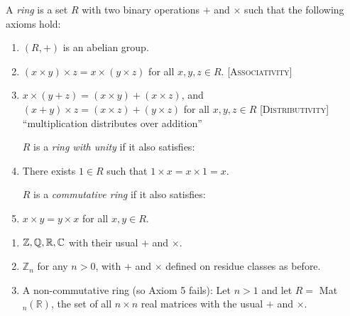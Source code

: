 \documentclass[10pt]{scrartcl}
\begin{document}
\begin{definition} A \emph{ring} is a set $R$ with two binary operations $+$ and $\times$ such that the following axioms hold:
 \begin{enumerate}
 \item $(R,+)$ is an abelian group.
 \item $(x \times y)\times z = x \times (y \times z)$ for all $x,y,z \in R$. \textsc{[Associativity]}
 \item $x \times (y + z) = (x \times y) + (x \times z)$, and $(x + y) \times z = (x \times z) + (y \times z)$ for all $x,y,z \in R$ \textsc{[Distributivity]} ``multiplication distributes over addition''\\ \vspace*{-10pt}
 
 $R$ is a \emph{ring with unity} if it also satisfies:\\  \vspace*{-12pt}

 \item  There exists $1 \in R$ such that $1 \times x = x \times 1 = x$. \\ \vspace*{-10pt}

$R$ is a \emph{commutative ring} if it also satisfies:\\ \vspace*{-12pt}
\item $x \times y = y \times x$ for all $x,y \in R$.\\ \vspace*{-10pt}

 \end{enumerate}
 \end{definition}\vspace*{10pt}
 
\begin{examples} \begin{enumerate}
 \item $\mathbb{Z}, \mathbb{Q}, \mathbb{R}, \mathbb{C}$ with their usual $+$ and $\times$.
 \item $\mathbb{Z}_n$ for any $n > 0$, with $+$ and $\times$ defined on residue classes as before.
 \item A non-commutative ring (so Axiom 5 fails): Let $n >1$ and let $R =$ Mat$_n(\mathbb{R})$, the set of all $n \times n$ real matrices with the usual $+$ and $\times$.	
 \end{enumerate}
 \end{examples}\vspace*{10pt}
\end{document}
